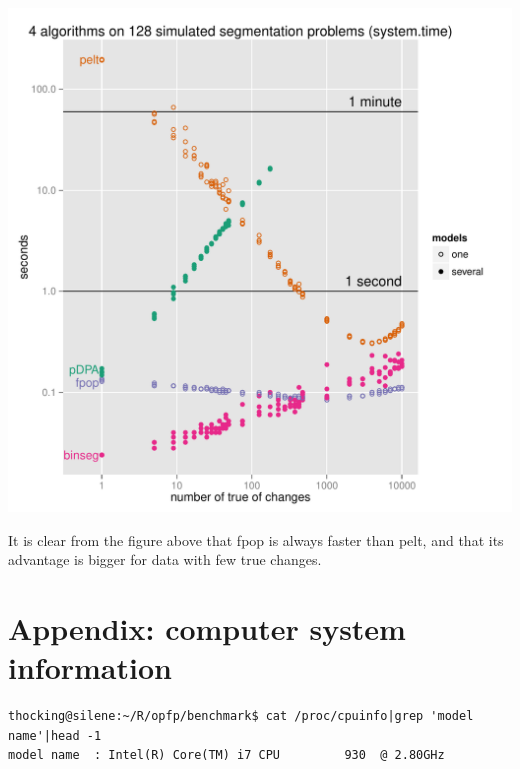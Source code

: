 \documentclass{article}
\begin{document}
\begin{center}
  \includegraphics[width=\textwidth]{figure-systemtime-simulation}
\end{center}

It is clear from the figure above that fpop is always faster than
pelt, and that its advantage is bigger for data with few true changes.

\newpage

\section{Appendix: computer system information}

\begin{verbatim}
thocking@silene:~/R/opfp/benchmark$ cat /proc/cpuinfo|grep 'model name'|head -1
model name	: Intel(R) Core(TM) i7 CPU         930  @ 2.80GHz
\end{verbatim}



\end{document}
